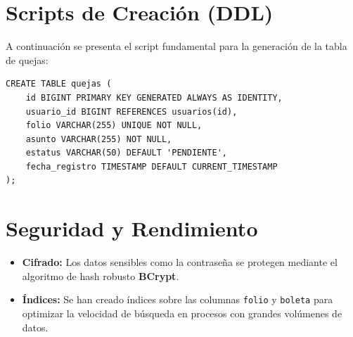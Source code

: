 \section{Scripts de Creación (DDL)}
A continuación se presenta el script fundamental para la generación de la tabla de quejas:

\begin{verbatim}
CREATE TABLE quejas (
    id BIGINT PRIMARY KEY GENERATED ALWAYS AS IDENTITY,
    usuario_id BIGINT REFERENCES usuarios(id),
    folio VARCHAR(255) UNIQUE NOT NULL,
    asunto VARCHAR(255) NOT NULL,
    estatus VARCHAR(50) DEFAULT 'PENDIENTE',
    fecha_registro TIMESTAMP DEFAULT CURRENT_TIMESTAMP
);
\end{verbatim}

\section{Seguridad y Rendimiento}
\begin{itemize}
    \item \textbf{Cifrado:} Los datos sensibles como la contraseña se protegen mediante el algoritmo de hash robusto \textbf{BCrypt}.
    \item \textbf{Índices:} Se han creado índices sobre las columnas \texttt{folio} y \texttt{boleta} para optimizar la velocidad de búsqueda en procesos con grandes volúmenes de datos.
\end{itemize}